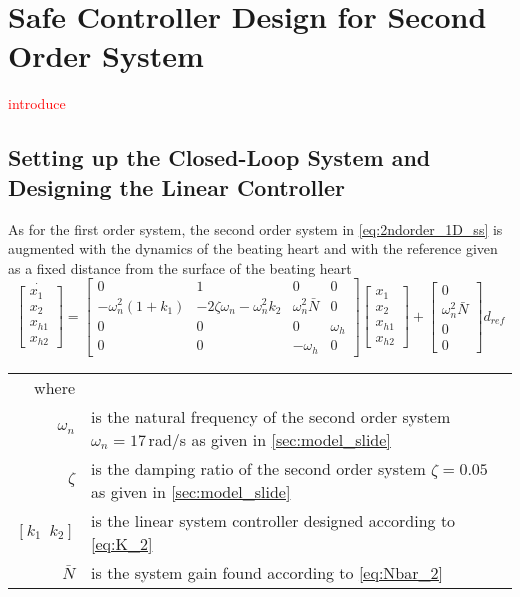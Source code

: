 \section{Safe Controller Design for Second Order System}
\textcolor{red}{introduce}

\subsection{Setting up the Closed-Loop System and Designing the Linear Controller}
As for the first order system, the second order system in \autoref{eq:2ndorder_1D_ss} is augmented with the dynamics of the beating heart and with the reference given as a fixed distance from the surface of the beating heart
\begin{equation}
\dot{\begin{bmatrix}
x_1\\x_2\\x_{h1}\\x_{h2}
\end{bmatrix}} = \begin{bmatrix}
0 & 1 & 0 & 0\\
-\omega_n^2(1+k_1)  & -2\zeta \omega_n-\omega_n^2 k_2  & \omega_n^2\bar{N} & 0\\
0 & 0 & 0 & \omega_h \\
0 & 0 & -\omega_h & 0
\end{bmatrix}\begin{bmatrix}
x_1\\x_2\\x_{h1}\\x_{h2}
\end{bmatrix} + \begin{bmatrix}
0\\\omega_n^2\bar{N} \\ 0 \\ 0
\end{bmatrix}d_{ref}
\end{equation}
\begin{tabular}{rl}
where &\\
$\omega_n$ & is the natural frequency of the second order system $\omega_n=17$\,rad/s as given in \autoref{sec:model_slide}\\
$\zeta$ & is the damping ratio of the second order system $\zeta=0.05$ as given in \autoref{sec:model_slide}\\
$[k_1\,\,\,k_2]$ & is the linear system controller designed according to \autoref{eq:K_2}\\
$\bar{N}$ & is the system gain found according to \autoref{eq:Nbar_2}
\end{tabular}\\



